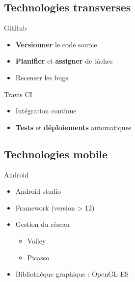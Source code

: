 \documentclass{beamer} %
\begin{document}
  \subsection{Technologies transverses}
  \begin{frame}{\subsecname}
    \begin{block}{GitHub}
      \begin{itemize}
        \item \textbf{Versionner} le code source
        \item \textbf{Planifier} et \textbf{assigner} de tâches
        \item Recenser les bugs
      \end{itemize}
    \end{block}

    \begin{block}{Travis CI}
      \begin{itemize}
        \item Intégration continue
        \item \textbf{Tests} et \textbf{déploiements} automatiques
      \end{itemize}
    \end{block}
    
  \end{frame}

  \subsection{Technologies mobile}
  \begin{frame}{\subsecname}
    \begin{block}{Android}
      \begin{itemize}
        \item Android studio
        \item Framework (version > 12)
        \item Gestion du réseau
        \begin{itemize}
          \item Volley
          \item Picasso
        \end{itemize}
        \item Bibliothèque graphique : OpenGL ES
      \end{itemize}
    \end{block}
    
  \end{frame}
\end{document}
